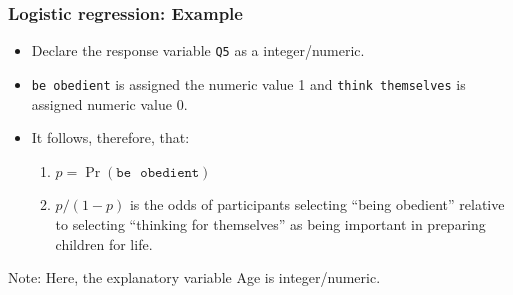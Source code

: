 \documentclass{beamer}\usepackage[]{graphicx}\usepackage[]{color}
\makeatletter
\newcommand{\hlnum}[1]{\textcolor[rgb]{0.686,0.059,0.569}{#1}}%
\newcommand{\hlstr}[1]{\textcolor[rgb]{0.192,0.494,0.8}{#1}}%
\newcommand{\hlcom}[1]{\textcolor[rgb]{0.678,0.584,0.686}{\textit{#1}}}%
\newcommand{\hlopt}[1]{\textcolor[rgb]{0,0,0}{#1}}%
\newcommand{\hlstd}[1]{\textcolor[rgb]{0.345,0.345,0.345}{#1}}%
\newcommand{\hlkwb}[1]{\textcolor[rgb]{0.69,0.353,0.396}{#1}}%
\newcommand{\hlkwd}[1]{\textcolor[rgb]{0.737,0.353,0.396}{\textbf{#1}}}%
\newenvironment{kframe}{%
 \def\at@end@of@kframe{}%
 \ifinner\ifhmode%
  \def\at@end@of@kframe{\end{minipage}}%
  \begin{minipage}{\columnwidth}%
 \fi\fi%
 \def\FrameCommand##1{\hskip\@totalleftmargin \hskip-\fboxsep
 \colorbox{shadecolor}{##1}\hskip-\fboxsep
     \hskip-\linewidth \hskip-\@totalleftmargin \hskip\columnwidth}%
 \MakeFramed {\advance\hsize-\width
   \@totalleftmargin\z@ \linewidth\hsize
   \@setminipage}}%
 {\par\unskip\endMakeFramed%
 \at@end@of@kframe}
\newenvironment{knitrout}{}{} %
\makeatother
\begin{document}
\begin{frame}[fragile]
\frametitle{Logistic regression: Example}
\begin{itemize}
  \item Declare the response variable \texttt{Q5} as a integer/numeric.
  \item \texttt{be obedient} is assigned the numeric value 1 and 
        \texttt{think themselves} is assigned numeric value 0.
  \item It follows, therefore, that:
  \begin{enumerate}    
    \item $p=\Pr(\mathtt{be\mbox{ }obedient})$
    \item $p/(1-p)$ is the odds of participants selecting 
          ``being obedient'' relative to selecting 
          ``thinking for themselves'' as being important in preparing
          children for life.
  \end{enumerate}
\end{itemize}
Note: Here, the explanatory variable Age is integer/numeric.
\end{frame}


\end{document}

